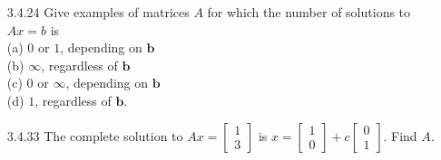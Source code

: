 \documentclass[10pt,twoside,reqno]{article}
\begin{document}
\begin{enumerate}
\item[3.4.24] Give examples of matrices $A$ for which the number of solutions to $Ax = b$ is\\
\vspace{3mm}
(a) $0$ or $1$, depending on $\pmb{b}$\\



(b) $\infty$, regardless of $\pmb{b}$\\



(c) $0$ or $\infty$, depending on $\pmb{b}$\\



(d) $1$, regardless of $\pmb{b}$.\\



\vspace{3mm}


\item[3.4.33] The complete solution to $Ax = \left[\begin{smallmatrix} 1\\ 3 \end{smallmatrix} \right]$ is $x = \left[\begin{smallmatrix} 1\\ 0 \end{smallmatrix} \right] + c \left[\begin{smallmatrix} 0\\ 1 \end{smallmatrix} \right]$. Find $A$.\\
 \vspace{3mm}



\end{enumerate}
\vspace{5mm}
\end{document}
